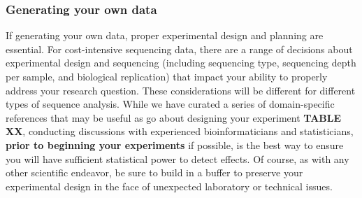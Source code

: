 \documentclass[10pt,letterpaper]{article}
\begin{document}




\subsubsection*{Generating your own data}
If generating your own data, proper experimental design and planning are essential. For cost-intensive sequencing data, there are a range of decisions about experimental design and sequencing (including sequencing type, sequencing depth per sample, and biological replication) that impact your ability to properly address your research question. These considerations will be different for different types of sequence analysis. While we have curated a series of domain-specific references that may be useful as go about designing your experiment \textbf{TABLE XX}, conducting discussions with experienced bioinformaticians and statisticians, \textbf{prior to beginning your experiments} if possible, is the best way to ensure you will have sufficient statistical power to detect effects. Of course, as with any other scientific endeavor, be sure to build in a buffer to preserve your experimental design in the face of unexpected laboratory or technical issues. 
\end{document}
